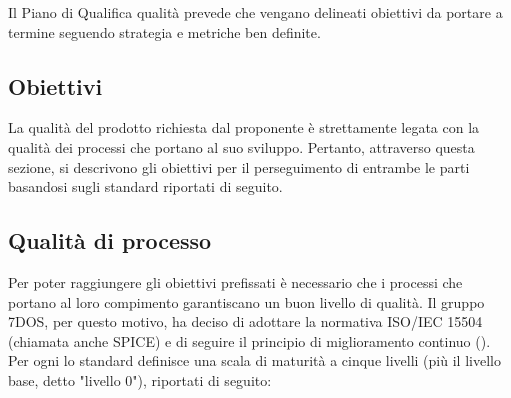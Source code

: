 Il Piano di Qualifica qualità prevede che vengano delineati obiettivi da portare a termine seguendo strategia e metriche ben definite.
\subsection{Obiettivi}
La qualità del prodotto richiesta dal proponente è strettamente legata con la qualità dei processi che portano al suo sviluppo. Pertanto, attraverso questa sezione, si descrivono gli obiettivi per il perseguimento di entrambe le parti basandosi sugli standard riportati di seguito. 
\subsection{Qualità di processo}
	Per poter raggiungere gli obiettivi prefissati è necessario che i processi che portano al loro compimento garantiscano un buon livello di qualità. Il gruppo 7DOS, per questo motivo, ha deciso di adottare la normativa ISO/IEC 15504 (chiamata anche SPICE) e di 	seguire il principio di miglioramento continuo (). \\ Per ogni  lo standard definisce una scala di maturità a cinque livelli (più il livello base, detto "livello 0"), riportati di seguito:
	
